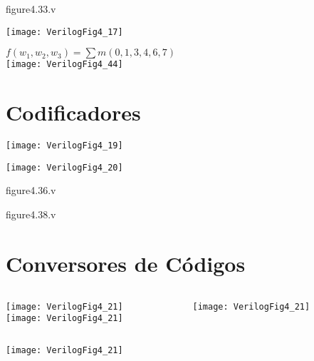 \begin{frame}[fragile]{figure4.33.v}
\end{frame} 

\begin{frame}{\insertsection} \centering
    \texttt{[image: VerilogFig4\_17]}
\end{frame}

\begin{frame}{\insertsection} \centering
    $f(w_1,w_2,w_3)=\sum m(0,1,3,4,6,7)$ \\
    \texttt{[image: VerilogFig4\_44]}
\end{frame}

\section{Codificadores}

\begin{frame}{\insertsection} \centering
    \texttt{[image: VerilogFig4\_19]}
\end{frame}

\begin{frame}{\insertsection} \centering
    \texttt{[image: VerilogFig4\_20]}
\end{frame}

\begin{frame}[fragile]{figure4.36.v}
\end{frame} 

\begin{frame}[fragile]{figure4.38.v}
\end{frame} 

\section{Conversores de Códigos}

\begin{frame}{\insertsection}   \centering
    \begin{columns}
        \begin{column}{0.40\textwidth} \centering
        \texttt{[image: VerilogFig4\_21]} \\
        \texttt{[image: VerilogFig4\_21]}
        \end{column}
        \begin{column}{0.60\textwidth}
        \texttt{[image: VerilogFig4\_21]}
        \end{column}    
    \end{columns}
    \texttt{[image: VerilogFig4\_21]}
\end{frame}

